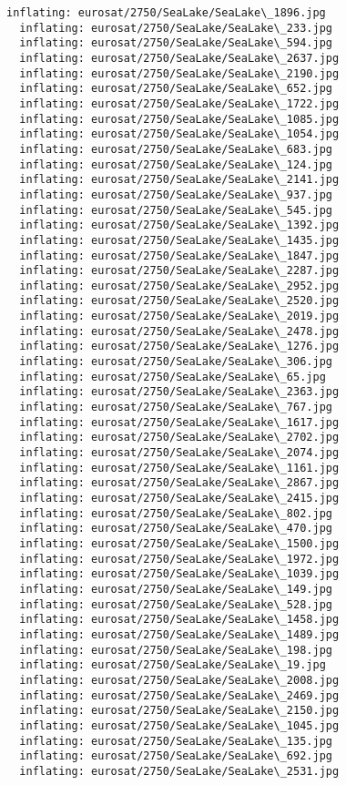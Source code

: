 \documentclass[11pt]{article}
\begin{document}
\begin{Verbatim}[commandchars=\\\{\}]
  inflating: eurosat/2750/SeaLake/SeaLake\_1896.jpg
  inflating: eurosat/2750/SeaLake/SeaLake\_233.jpg
  inflating: eurosat/2750/SeaLake/SeaLake\_594.jpg
  inflating: eurosat/2750/SeaLake/SeaLake\_2637.jpg
  inflating: eurosat/2750/SeaLake/SeaLake\_2190.jpg
  inflating: eurosat/2750/SeaLake/SeaLake\_652.jpg
  inflating: eurosat/2750/SeaLake/SeaLake\_1722.jpg
  inflating: eurosat/2750/SeaLake/SeaLake\_1085.jpg
  inflating: eurosat/2750/SeaLake/SeaLake\_1054.jpg
  inflating: eurosat/2750/SeaLake/SeaLake\_683.jpg
  inflating: eurosat/2750/SeaLake/SeaLake\_124.jpg
  inflating: eurosat/2750/SeaLake/SeaLake\_2141.jpg
  inflating: eurosat/2750/SeaLake/SeaLake\_937.jpg
  inflating: eurosat/2750/SeaLake/SeaLake\_545.jpg
  inflating: eurosat/2750/SeaLake/SeaLake\_1392.jpg
  inflating: eurosat/2750/SeaLake/SeaLake\_1435.jpg
  inflating: eurosat/2750/SeaLake/SeaLake\_1847.jpg
  inflating: eurosat/2750/SeaLake/SeaLake\_2287.jpg
  inflating: eurosat/2750/SeaLake/SeaLake\_2952.jpg
  inflating: eurosat/2750/SeaLake/SeaLake\_2520.jpg
  inflating: eurosat/2750/SeaLake/SeaLake\_2019.jpg
  inflating: eurosat/2750/SeaLake/SeaLake\_2478.jpg
  inflating: eurosat/2750/SeaLake/SeaLake\_1276.jpg
  inflating: eurosat/2750/SeaLake/SeaLake\_306.jpg
  inflating: eurosat/2750/SeaLake/SeaLake\_65.jpg
  inflating: eurosat/2750/SeaLake/SeaLake\_2363.jpg
  inflating: eurosat/2750/SeaLake/SeaLake\_767.jpg
  inflating: eurosat/2750/SeaLake/SeaLake\_1617.jpg
  inflating: eurosat/2750/SeaLake/SeaLake\_2702.jpg
  inflating: eurosat/2750/SeaLake/SeaLake\_2074.jpg
  inflating: eurosat/2750/SeaLake/SeaLake\_1161.jpg
  inflating: eurosat/2750/SeaLake/SeaLake\_2867.jpg
  inflating: eurosat/2750/SeaLake/SeaLake\_2415.jpg
  inflating: eurosat/2750/SeaLake/SeaLake\_802.jpg
  inflating: eurosat/2750/SeaLake/SeaLake\_470.jpg
  inflating: eurosat/2750/SeaLake/SeaLake\_1500.jpg
  inflating: eurosat/2750/SeaLake/SeaLake\_1972.jpg
  inflating: eurosat/2750/SeaLake/SeaLake\_1039.jpg
  inflating: eurosat/2750/SeaLake/SeaLake\_149.jpg
  inflating: eurosat/2750/SeaLake/SeaLake\_528.jpg
  inflating: eurosat/2750/SeaLake/SeaLake\_1458.jpg
  inflating: eurosat/2750/SeaLake/SeaLake\_1489.jpg
  inflating: eurosat/2750/SeaLake/SeaLake\_198.jpg
  inflating: eurosat/2750/SeaLake/SeaLake\_19.jpg
  inflating: eurosat/2750/SeaLake/SeaLake\_2008.jpg
  inflating: eurosat/2750/SeaLake/SeaLake\_2469.jpg
  inflating: eurosat/2750/SeaLake/SeaLake\_2150.jpg
  inflating: eurosat/2750/SeaLake/SeaLake\_1045.jpg
  inflating: eurosat/2750/SeaLake/SeaLake\_135.jpg
  inflating: eurosat/2750/SeaLake/SeaLake\_692.jpg
  inflating: eurosat/2750/SeaLake/SeaLake\_2531.jpg

\end{Verbatim}
\end{document}
